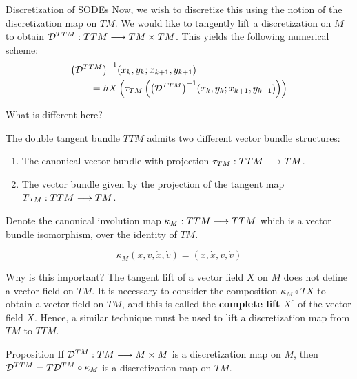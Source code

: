 \documentclass{beamer}
\begin{document}
\begin{frame}{Discretization of SODEs}
  Now, we wish to discretize this using the notion of the discretization map on $TM$. We would like to tangently lift a discretization on $M$ to obtain $\mathcal{D}^{TTM}: TTM \longrightarrow TM \times TM$. This yields the following numerical scheme:
  \begin{equation}
  \label{eq:disc}
  \begin{split}
    {\left(\ensuremath{\mathcal{D}}^{TTM}\right)}^{-1} & (x_k, y_k; x_{k+1}, y_{k+1}) \\ = h X & \left( \tau_{TM} \left( {\left(\mathcal{D}^{TTM}\right)}^{-1}(x_k, y_k; x_{k+1}, y_{k+1})\right)\right)
  \end{split}
  \end{equation}
  
\end{frame}

\begin{frame}{What is different here?}

  The double tangent bundle $TTM$ admits two different vector bundle structures:

  \begin{enumerate}
    \item The canonical vector bundle with projection $\tau_{TM} : TTM \longrightarrow TM$.
    \item The vector bundle given by the projection of the tangent map $T \tau_M : TTM \longrightarrow TM$. 
  \end{enumerate}

  \pause
  Denote the canonical involution map $\kappa_M : TTM \longrightarrow TTM$ which is a vector bundle isomorphism, over the identity of $TM$.

\[
 \kappa_M (x, v, \dot{x}, \dot{v}) = (x,\dot{x}, v, \dot{v})
\]
  
\end{frame}

\begin{frame}{Why is this important?}
  The tangent lift of a vector field $X$ on $M$ does not define a vector field on $TM$. It is necessary to consider the composition $\kappa_M \circ TX$ to obtain a vector field on $TM$, and this is called the \textbf{complete lift} $X^c$ of the vector field $X$. 
  Hence, a similar technique must be used to lift a discretization map from $TM$ to $TTM$.

  \begin{block}{Proposition}
    If $\mathcal{D}^{TM} : TM \longrightarrow M \times M$ is a discretization map on $M$, then $\mathcal{D}^{TTM} = T\mathcal{D}^{TM} \circ \kappa_M$ is a discretization map on $TM$.
  \end{block}
  
\end{frame}
\end{document}
